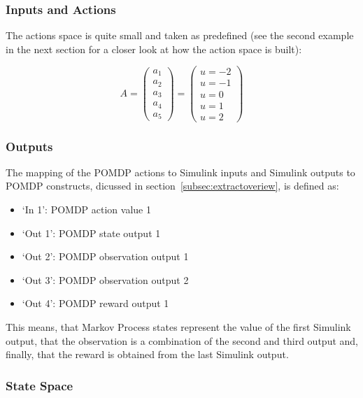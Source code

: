 \subsubsection{Inputs and Actions}

The actions space is quite small and taken as predefined (see the second example in the next section for a closer look at how the action space is built):

\[
A = \begin{pmatrix}
  a_1 \\ a_2 \\ a_3 \\ a_4 \\ a_5
\end{pmatrix}
 = \begin{pmatrix}
 u = -2 \\ u = -1 \\ u = 0 \\ u = 1 \\ u = 2
 \end{pmatrix}
\]

\subsubsection{Outputs}



The mapping of the POMDP actions to Simulink inputs and Simulink outputs to POMDP constructs, dicussed in section~\ref{subsec:extractoveriew}, is defined as:

\begin{itemize}
\item `In 1': POMDP action value 1
\item `Out 1': POMDP state output 1
\item `Out 2': POMDP observation output 1
\item `Out 3': POMDP observation output 2
\item `Out 4': POMDP reward output 1
\end{itemize}

This means, that Markov Process states represent the value of the first Simulink output, that the observation is a combination of the second and third output and, finally, that the reward is obtained from the last Simulink output.

\subsubsection{State Space}

